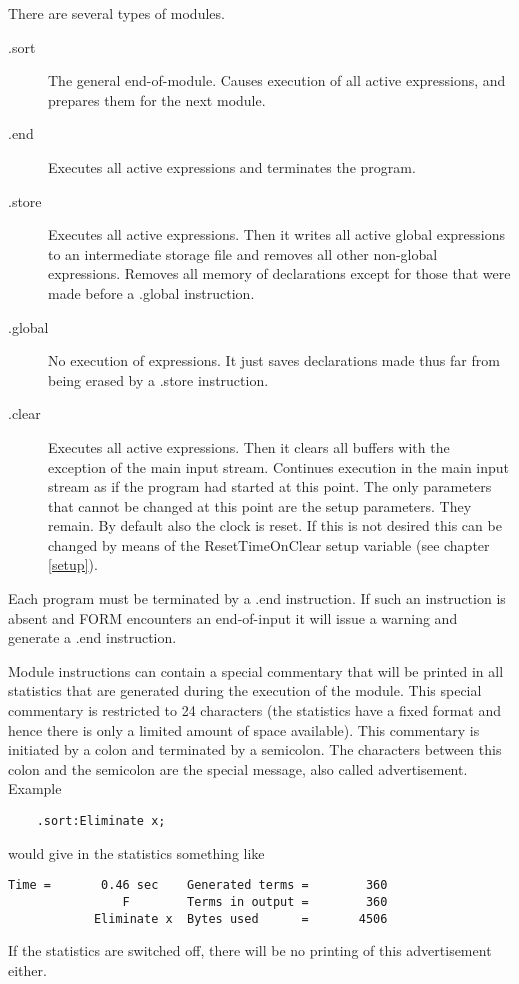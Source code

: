 There are several types of modules.
\begin{description}
\item[.sort] \label{instrsort} The general end-of-module. 
Causes execution of all active expressions, and prepares them for the next 
module.
\item[.end] \label{instrend} Executes all active expressions 
and terminates the program.
\item[.store] \label{instrstore} Executes all active 
expressions. Then it writes all active global expressions to an 
intermediate storage file and removes all other 
non-global expressions. Removes all memory of declarations except for those 
that were made before a .global instruction.
\item[.global] \label{instrglobal} No execution of 
expressions. It just saves declarations made thus far from being erased by 
a .store instruction.
\item[.clear] \label{instrclear} Executes all active 
expressions. Then it clears all buffers with the exception of the main 
input stream. Continues execution in the main input stream as if the 
program had started at this point. The only parameters that cannot be 
changed at this point are the setup parameters. They remain. By default 
also the clock is reset. If this is not desired this can be 
changed by means of the ResetTimeOnClear setup 
variable (see chapter \ref{setup}).
\end{description}
Each program must be terminated by a .end instruction. If such an 
instruction is absent and FORM encounters an end-of-input it will issue a 
warning and generate a .end instruction.

Module instructions can contain a special commentary that will be printed 
in all statistics that are generated during the execution of the module. 
This special commentary is restricted to 24 characters (the statistics have 
a fixed format and hence there is only a limited amount of space 
available). This commentary is initiated by a colon and terminated by a 
semicolon. The characters between this colon and the semicolon are the 
special message, also called advertisement. Example
\begin{verbatim}
	.sort:Eliminate x;
\end{verbatim}
would give in the statistics something like
\begin{verbatim}
Time =       0.46 sec    Generated terms =        360
                F        Terms in output =        360
            Eliminate x  Bytes used      =       4506
\end{verbatim}
If the statistics are switched off, there will be no printing of this 
advertisement either.

